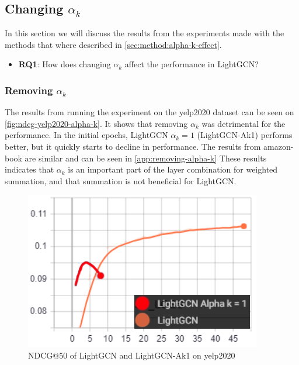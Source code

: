 \subsection{Changing $\alpha_k$}\label{subsec:changing-alpha-k}
In this section we will discuss the results from the experiments made with the methods that where described in \autoref{sec:method:alpha-k-effect}.
\begin{itemize}
    \item \textbf{RQ1}: How does changing $\alpha_k$ affect the performance in LightGCN?
\end{itemize}

\subsubsection{Removing $\alpha_k$}\label{subsubsec:remove-alpha-k}
The results from running the experiment on the yelp2020 dataset can be seen on \autoref{fig:ndcg-yelp2020-alpha-k}.
It shows that removing $\alpha_k$ was detrimental for the performance.
In the initial epochs, LightGCN $\alpha_k = 1$ (LightGCN-Ak1) performs better, but it quickly starts to decline in performance.
The results from amazon-book are similar and can be seen in \autoref{app:removing-alpha-k}
These results indicates that $\alpha_k$ is an important part of the layer combination for weighted summation, and that summation is not beneficial for LightGCN.
\begin{figure}
    \includegraphics[width=\linewidth]{figures/alpha-k-results/yelp2020-ndcg.png}
    \caption{NDCG@50 of LightGCN and LightGCN-Ak1 on yelp2020}
    \label{fig:ndcg-yelp2020-alpha-k}
\end{figure}

